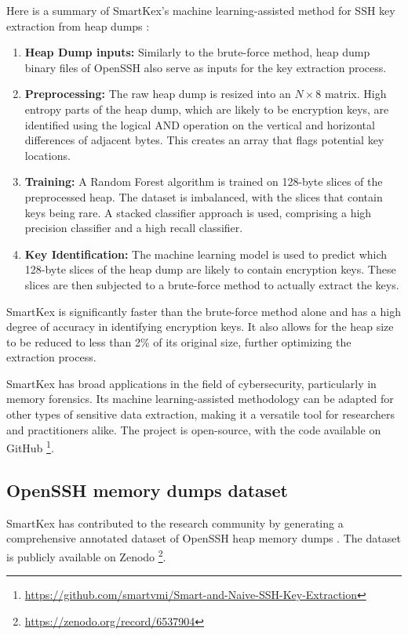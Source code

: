         Here is a summary of SmartKex's machine learning-assisted method for SSH key extraction from heap dumps \cite{SmartKex22}:

        \begin{enumerate}
            \item \textbf{Heap Dump inputs:} Similarly to the brute-force method, heap dump binary files of OpenSSH also serve as inputs for the key extraction process.
            \item \textbf{Preprocessing:} The raw heap dump is resized into an $N \times 8$ matrix. High entropy parts of the heap dump, which are likely to be encryption keys, are identified using the logical AND operation on the vertical and horizontal differences of adjacent bytes. This creates an array that flags potential key locations.
            \item \textbf{Training:} A Random Forest algorithm is trained on 128-byte slices of the preprocessed heap. The dataset is imbalanced, with the slices that contain keys being rare. A stacked classifier approach is used, comprising a high precision classifier and a high recall classifier.
            \item \textbf{Key Identification:} The machine learning model is used to predict which 128-byte slices of the heap dump are likely to contain encryption keys. These slices are then subjected to a brute-force method to actually extract the keys.
        \end{enumerate}
        
    SmartKex is significantly faster than the brute-force method alone and has a high degree of accuracy in identifying encryption keys. It also allows for the heap size to be reduced to less than 2\% of its original size, further optimizing the extraction process.

    SmartKex has broad applications in the field of cybersecurity, particularly in memory forensics. Its machine learning-assisted methodology can be adapted for other types of sensitive data extraction, making it a versatile tool for researchers and practitioners alike. The project is open-source, with the code available on GitHub \footnote{\url{https://github.com/smartvmi/Smart-and-Naive-SSH-Key-Extraction}}.

    \subsection{OpenSSH memory dumps dataset}

    SmartKex has contributed to the research community by generating a comprehensive annotated dataset of OpenSSH heap memory dumps \cite{SmartKex22}. The dataset is publicly available on Zenodo \footnote{\url{https://zenodo.org/record/6537904}}. 

